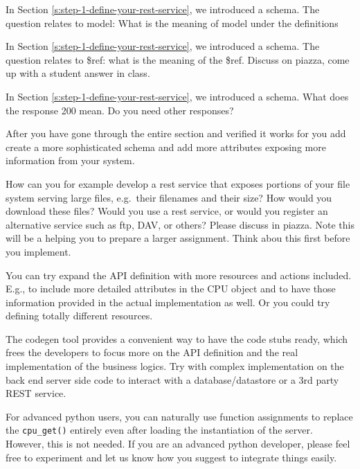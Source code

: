 \begin{exercise}
  In Section \ref{s:step-1-define-your-rest-service}, we introduced a
  schema. The question relates to model: What is the meaning of model
  under the definitions
\end{exercise}

\begin{exercise}
  In Section \ref{s:step-1-define-your-rest-service}, we introduced a
  schema. The question relates to \$ref: what is the meaning of the
  \$ref. Discuss on piazza, come up with a student answer in class.
\end{exercise}

\begin{exercise}
  In Section \ref{s:step-1-define-your-rest-service}, we introduced a
  schema.  What does the response 200 mean. Do you need other
  responses?
\end{exercise}

\begin{exercise}
  After you have gone through the entire section and verified it works
  for you add create a more sophisticated schema and add more attributes
  exposing more information from your system.
\end{exercise}

\begin{exercise}
  How can you for example develop a rest service that exposes portions
  of your file system serving large files, e.g.~their filenames and
  their size? How would you download these files? Would you use a rest
  service, or would you register an alternative service such as ftp,
  DAV, or others? Please discuss in piazza. Note this will be a helping
  you to prepare a larger assignment. Think abou this first before you
  implement.
\end{exercise}


\begin{exercise}
You can try expand the API definition with more resources and
actions included. E.g., to include more detailed attributes in the CPU
object and to have those information provided in the actual
implementation as well. Or you could try defining totally different
resources.
\end{exercise}

\begin{exercise}
The codegen tool provides a convenient way to have the code
stubs ready, which frees the developers to focus more on the API
definition and the real implementation of the business logics. Try with
complex implementation on the back end server side code to interact with
a database/datastore or a 3rd party REST service.
\end{exercise}

\begin{exercise}
For advanced python users, you can naturally use function assignments to
replace the \texttt{cpu\_get()} entirely even after loading the
instantiation of the server. However, this is not needed. If you are an
advanced python developer, please feel free to experiment and let us
know how you suggest to integrate things easily.
\end{exercise}